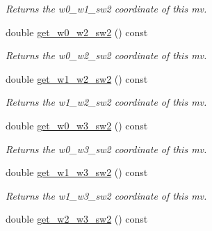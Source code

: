 \begin{DoxyCompactItemize}
\begin{DoxyCompactList}\small\item\em Returns the w0\-\_\-w1\-\_\-sw2 coordinate of this mv. \end{DoxyCompactList}\item 
\hypertarget{classe3ga_1_1mv_a835d02548119094d5ac30e0c9b2be375}{double \hyperlink{classe3ga_1_1mv_a835d02548119094d5ac30e0c9b2be375}{get\-\_\-w0\-\_\-w2\-\_\-sw2} () const }\label{classe3ga_1_1mv_a835d02548119094d5ac30e0c9b2be375}

\begin{DoxyCompactList}\small\item\em Returns the w0\-\_\-w2\-\_\-sw2 coordinate of this mv. \end{DoxyCompactList}\item 
\hypertarget{classe3ga_1_1mv_aec9e24dfec5f8d56786c329680b69ded}{double \hyperlink{classe3ga_1_1mv_aec9e24dfec5f8d56786c329680b69ded}{get\-\_\-w1\-\_\-w2\-\_\-sw2} () const }\label{classe3ga_1_1mv_aec9e24dfec5f8d56786c329680b69ded}

\begin{DoxyCompactList}\small\item\em Returns the w1\-\_\-w2\-\_\-sw2 coordinate of this mv. \end{DoxyCompactList}\item 
\hypertarget{classe3ga_1_1mv_a8a17c47977cbd2e2c6af87f47cafefed}{double \hyperlink{classe3ga_1_1mv_a8a17c47977cbd2e2c6af87f47cafefed}{get\-\_\-w0\-\_\-w3\-\_\-sw2} () const }\label{classe3ga_1_1mv_a8a17c47977cbd2e2c6af87f47cafefed}

\begin{DoxyCompactList}\small\item\em Returns the w0\-\_\-w3\-\_\-sw2 coordinate of this mv. \end{DoxyCompactList}\item 
\hypertarget{classe3ga_1_1mv_ad5e157e88d9028a714c2ba6c434593fe}{double \hyperlink{classe3ga_1_1mv_ad5e157e88d9028a714c2ba6c434593fe}{get\-\_\-w1\-\_\-w3\-\_\-sw2} () const }\label{classe3ga_1_1mv_ad5e157e88d9028a714c2ba6c434593fe}

\begin{DoxyCompactList}\small\item\em Returns the w1\-\_\-w3\-\_\-sw2 coordinate of this mv. \end{DoxyCompactList}\item 
\hypertarget{classe3ga_1_1mv_a0fb9941b66309d28343b5513d29a6d72}{double \hyperlink{classe3ga_1_1mv_a0fb9941b66309d28343b5513d29a6d72}{get\-\_\-w2\-\_\-w3\-\_\-sw2} () const }\label{classe3ga_1_1mv_a0fb9941b66309d28343b5513d29a6d72}


\end{DoxyCompactItemize}
